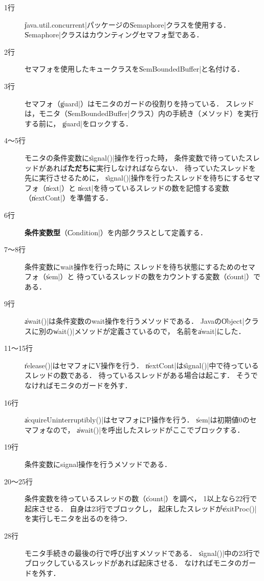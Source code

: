 \begin{description}
\item [1行]
\|java.util.concurrent|パッケージの\|Semaphore|クラスを使用する．
\|Semaphore|クラスはカウンティングセマフォ型である．

\item [2行]
セマフォを使用したキュークラスを\|SemBoundedBuffer|と名付ける．

\item [3行]
セマフォ（\|guard|）はモニタのガードの役割りを持っている．
スレッドは，モニタ（\|SemBoundedBuffer|クラス）内の手続き（メソッド）を実行する前に，
\|guard|をロックする．

\item [4〜5行]
モニタの条件変数に\|signal()|操作を行った時，
条件変数で待っていたスレッドがあれば{\bf ただちに}実行しなければならない．
待っていたスレッドを先に実行させるために，
\|signal()|操作を行ったスレッドを待ちにするセマフォ（\|next|）と
\|next|を待っているスレッドの数を記憶する変数（\|nextCont|）を準備する．

\item [6行]
{\bf 条件変数型}（\|Condition|）を内部クラスとして定義する．

\item [7〜8行]
条件変数にwait操作を行った時に
スレッドを待ち状態にするためのセマフォ（\|sem|）と
待っているスレッドの数をカウントする変数（\|count|）である．

\item [9行]
\|await()|は条件変数のwait操作を行うメソッドである．
Javaの\|Object|クラスに別の\|wait()|メソッドが定義さているので，
名前を\|await|にした．

\item [11〜15行]
\|release()|はセマフォにV操作を行う．
\|nextCont|は\|signal()|中で待っているスレッドの数である．
待っているスレッドがある場合は起こす．
そうでなければモニタのガードを外す．

\item [16行]
\|acquireUninterruptibly()|はセマフォにP操作を行う．
\|sem|は初期値0のセマフォなので，
\|await()|を呼出したスレッドがここでブロックする．

\item [19行]
条件変数にsignal操作を行うメソッドである．

\item [20〜25行]
条件変数を待っているスレッドの数（\|count|）を調べ，
1以上なら22行で起床させる．
自身は23行でブロックし，
起床したスレッドが\|exitProc()|を実行しモニタを出るのを待つ．

\item [28行]
モニタ手続きの最後の行で呼び出すメソッドである．
\|signal()|中の23行でブロックしているスレッドがあれば起床させる．
なければモニタのガードを外す．

\end{description}

